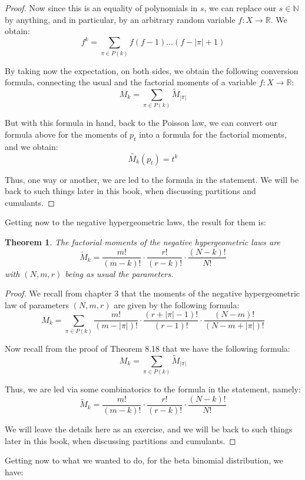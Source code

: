 \documentclass[12pt]{amsbook}
\newtheorem{theorem}{Theorem}[chapter]
\begin{document}
\begin{proof}
Now since this is an equality of polynomials in $s$, we can replace our $s\in\mathbb N$ by anything, and in particular, by an arbitrary random variable $f:X\to\mathbb R$. We obtain:
$$f^k=\sum_{\pi\in P(k)}f(f-1)\ldots(f-|\pi|+1)$$

By taking now the expectation, on both sides, we obtain the following conversion formula, connecting the usual and the factorial moments of a variable $f:X\to\mathbb R$:
$$M_k=\sum_{\pi\in P(k)}\widetilde{M}_{|\pi|}$$

But with this formula in hand, back to the Poisson law, we can convert our formula above for the moments of $p_t$ into a formula for the factorial moments, and we obtain:
$$\widetilde{M_k}(p_t)=t^k$$

Thus, one way or another, we are led to the formula in the statement. We will be back to such things later in this book, when discussing partitions and cumulants.
\end{proof}

Getting now to the negative hypergeometric laws, the result for them is:

\begin{theorem}
The factorial moments of the negative hypergeometric laws are
$$\widetilde{M}_k=\frac{m!}{(m-k)!}\cdot\frac{r!}{(r-k)!}\cdot\frac{(N-k)!}{N!}$$
with $(N,m,r)$ being as usual the parameters.
\end{theorem}

\begin{proof}
We recall from chapter 3 that the moments of the negative hypergeometric law of parameters $(N,m,r)$ are given by the following formula:
$$M_k=\sum_{\pi\in P(k)}\frac{m!}{(m-|\pi|)!}\cdot\frac{(r+|\pi|-1)!}{(r-1)!}\cdot\frac{(N-m)!}{(N-m+|\pi|)!}$$

Now recall from the proof of Theorem 8.18 that we have the following formula:
$$M_k=\sum_{\pi\in P(k)}\widetilde{M}_{|\pi|}$$

Thus, we are led via some combinatorics to the formula in the statement, namely:
$$\widetilde{M}_k=\frac{m!}{(m-k)!}\cdot\frac{r!}{(r-k)!}\cdot\frac{(N-k)!}{N!}$$

We will leave the details here as an exercise, and we will be back to such things later in this book, when discussing partitions and cumulants.
\end{proof}

Getting now to what we wanted to do, for the beta binomial distribution, we have:

\end{document}
